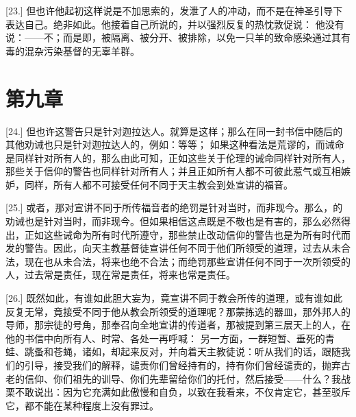 [23.] 但也许他起初这样说是不加思索的，发泄了人的冲动，而不是在神圣引导下表达自己。绝非如此。他接着自己所说的，并以强烈反复的热忱敦促说： 他没有说：——不；而是即，被隔离、被分开、被排除，以免一只羊的致命感染通过其有毒的混杂污染基督的无辜羊群。\par


\section{第九章}

\par

[24.] 但也许这警告只是针对迦拉达人。就算是这样；那么在同一封书信中随后的其他劝诫也只是针对迦拉达人的，例如：等等； 如果这种看法是荒谬的，而诫命是同样针对所有人的，那么由此可知，正如这些关于伦理的诫命同样针对所有人，那些关于信仰的警告也同样针对所有人；并且正如所有人都不可彼此惹气或互相嫉妒，同样，所有人都不可接受任何不同于天主教会到处宣讲的福音。\par

[25.] 或者，那对宣讲不同于所传福音者的绝罚是针对当时，而非现今。那么，的劝诫也是针对当时，而非现今。但如果相信这点既是不敬也是有害的，那么必然得出，正如这些诫命为所有时代所遵守，那些禁止改动信仰的警告也是为所有时代而发的警告。因此，向天主教基督徒宣讲任何不同于他们所领受的道理，过去从未合法，现在也从未合法，将来也绝不合法；而绝罚那些宣讲任何不同于一次所领受的人，过去常是责任，现在常是责任，将来也常是责任。\par

[26.] 既然如此，有谁如此胆大妄为，竟宣讲不同于教会所传的道理，或有谁如此反复无常，竟接受不同于他从教会所领受的道理呢？那蒙拣选的器皿，那外邦人的导师，那宗徒的号角，那奉召向全地宣讲的传道者，那被提到第三层天上的人，在他的书信中向所有人、时常、各处一再呼喊： 另一方面，一群短暂、垂死的青蛙、跳蚤和苍蝇，诸如，却起来反对，并向着天主教徒说：听从我们的话，跟随我们的引导，接受我们的解释，谴责你们曾经持有的，持有你们曾经谴责的，抛弃古老的信仰、你们祖先的训导、你们先辈留给你们的托付，然后接受——什么？我战栗不敢说出：因为它充满如此傲慢和自负，以致在我看来，不仅肯定它，甚至驳斥它，都不能在某种程度上没有罪过。\par

